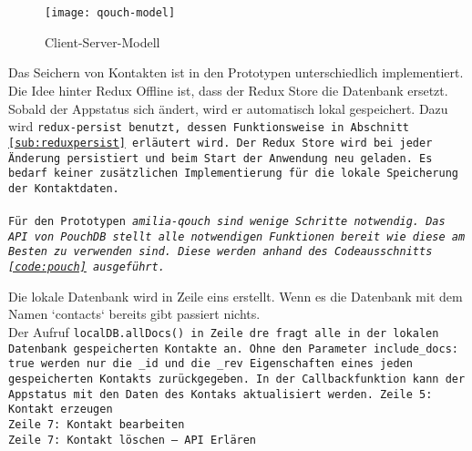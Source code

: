 \\\\
%
% 
%
\begin{figure}[H]
  \centering
  \texttt{[image: qouch-model]}
  \grayRule
  \caption{Client-Server-Modell}
  \label{fig:qouch-model}
\end{figure}
%
%
Das Seichern von Kontakten ist in den Prototypen unterschiedlich implementiert.
Die Idee hinter Redux Offline ist, dass der Redux Store die Datenbank ersetzt. Sobald der Appstatus sich ändert, wird er automatisch lokal gespeichert. Dazu wird \tt{redux-persist} benutzt, dessen Funktionsweise in Abschnitt \ref{sub:reduxpersist} erläutert wird. Der Redux Store wird bei jeder Änderung persistiert und beim Start der Anwendung neu geladen. Es bedarf keiner zusätzlichen Implementierung für die lokale Speicherung der Kontaktdaten.\\\\
Für den Prototypen \it{amilia-qouch} sind wenige Schritte notwendig. Das \gls{API} von PouchDB stellt alle notwendigen Funktionen bereit wie diese am Besten zu verwenden sind.  Diese werden anhand des Codeausschnitts \ref{code:pouch} ausgeführt.
\begin{center}
  
\end{center}
Die lokale Datenbank wird in Zeile eins erstellt. Wenn es die Datenbank mit dem Namen `contacts` bereits gibt passiert nichts.\\
Der Aufruf \tt{localDB.allDocs()} in Zeile dre fragt alle in der lokalen Datenbank gespeicherten Kontakte an. Ohne den Parameter \tt{include\_docs: true} werden nur die \tt{\_id} und die \tt{\_rev} Eigenschaften eines jeden gespeicherten Kontakts zurückgegeben. In der Callbackfunktion kann der Appstatus mit den Daten des Kontaks aktualisiert werden. 
Zeile 5: Kontakt erzeugen\\
Zeile 7: Kontakt bearbeiten\\
Zeile 7: Kontakt löschen -- API Erlären 
